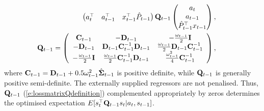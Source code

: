 \begin{eqnarray}
\label{e:lossmatrixQdefinition}
&&\hspace*{-6ex}\begin{pmatrix}
    a^{\top}_{t} & a_{t-1}^{\top} & x^{\top}_{t-1}\hat{P}_{t-1}
\end{pmatrix}\mat{Q}_{t-1}
\begin{pmatrix}
    a_{t} \\ a_{t-1} \\ \hat{P}^{\top}_{t-1}x_{t-1}
\end{pmatrix},\\
\nonumber
&&\hspace*{-6ex}\mat{Q}_{t-1} = \left(\begin{array}{ccc}
        \mat{C}_{t-1} & -\mat{D}_{t-1} & -\frac{\omega_{t-1}}{2}\mat{I} \\
        -\mat{D}_{t-1} & \mat{D}_{t-1}\mat{C}^{-1}_{t-1}\mat{D}_{t-1} & \frac{\omega_{t-1}}{2}\mat{D}_{t-1}\mat{C}_{t-1}^{-1}\\
        -\frac{\omega_{t-1}}{2}\mat{I} & \frac{\omega_{t-1}}{2}\mat{C}^{-1}_{t-1}\mat{D}_{t-1} & \frac{\omega^2_{t-1}}{4}\mat{C}^{-1}_{t-1}
    \end{array}\right),
\end{eqnarray}
where $\mathbf{C}_{t-1} = \mathbf{D}_{t-1} + 0.5\omega^{2}_{t-1}\hat{\mathbf{\Sigma}}_{t-1}$ is positive definite, while $\mathbf{Q}_{t-1}$ is generally positive semi-definite. The externally supplied regressors are not penalised. Thus, $ \mathbf{Q}_{t-1}$ (\ref{e:lossmatrixQdefinition})  complemented appropriately by zeros determines the optimised expectation $E[s^{\top}_{t}\mathbf{Q}_{t-1}s_{t}|a_{t},s_{t-1}]$.

